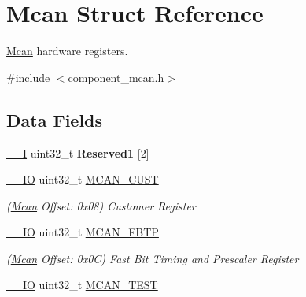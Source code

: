 \hypertarget{structMcan}{}\section{Mcan Struct Reference}
\label{structMcan}


\mbox{\hyperlink{structMcan}{Mcan}} hardware registers.  




{\ttfamily \#include $<$component\+\_\+mcan.\+h$>$}

\subsection*{Data Fields}
\begin{DoxyCompactItemize}
\item 
\mbox{\label{structMcan_a371c43c99e1e4d39026e7b3a69ac2305}} 
\mbox{\hyperlink{core__cm7_8h_af63697ed9952cc71e1225efe205f6cd3}{\+\_\+\+\_\+I}} uint32\+\_\+t {\bfseries Reserved1} \mbox{[}2\mbox{]}
\item 
\mbox{\label{structMcan_a76ff94fb4fd91b7416a9aed216f1dac4}} 
\mbox{\hyperlink{core__cm7_8h_aec43007d9998a0a0e01faede4133d6be}{\+\_\+\+\_\+\+IO}} uint32\+\_\+t \mbox{\hyperlink{structMcan_a76ff94fb4fd91b7416a9aed216f1dac4}{M\+C\+A\+N\+\_\+\+C\+U\+ST}}
\begin{DoxyCompactList}\small\item\em (\mbox{\hyperlink{structMcan}{Mcan}} Offset\+: 0x08) Customer Register \end{DoxyCompactList}\item 
\mbox{\label{structMcan_a759d99b9e60a72853e95e2a209802ace}} 
\mbox{\hyperlink{core__cm7_8h_aec43007d9998a0a0e01faede4133d6be}{\+\_\+\+\_\+\+IO}} uint32\+\_\+t \mbox{\hyperlink{structMcan_a759d99b9e60a72853e95e2a209802ace}{M\+C\+A\+N\+\_\+\+F\+B\+TP}}
\begin{DoxyCompactList}\small\item\em (\mbox{\hyperlink{structMcan}{Mcan}} Offset\+: 0x0C) Fast Bit Timing and Prescaler Register \end{DoxyCompactList}\item 
\mbox{\label{structMcan_ab983f9187cdebf4848a0c158ae0db3de}} 
\mbox{\hyperlink{core__cm7_8h_aec43007d9998a0a0e01faede4133d6be}{\+\_\+\+\_\+\+IO}} uint32\+\_\+t \mbox{\hyperlink{structMcan_ab983f9187cdebf4848a0c158ae0db3de}{M\+C\+A\+N\+\_\+\+T\+E\+ST}}

\end{DoxyCompactItemize}
